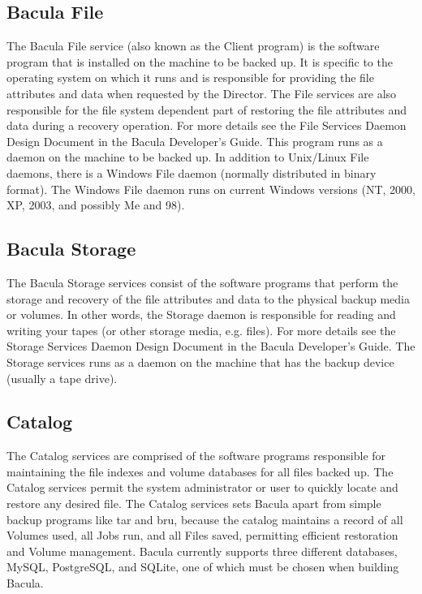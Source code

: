 \subsection*{Bacula File}
   \label{FDDef}
   The Bacula File service (also known as the Client program) is the software
   program that is installed on the machine to be backed up.
   It is specific to the
   operating system on which it runs and is responsible for providing the
   file attributes and data when requested by the Director.  The File
   services are also responsible for the file system dependent part of
   restoring the file attributes and data during a recovery operation.  For
   more details see the File Services Daemon Design Document in the Bacula
   Developer's Guide.  This program runs as a daemon on the machine to be
   backed up.
   In addition to Unix/Linux File daemons, there is a Windows File daemon
   (normally distributed in binary format).  The Windows File daemon runs
   on current Windows versions (NT, 2000, XP, 2003, and possibly Me and
   98).

\subsection*{Bacula Storage}
   \label{SDDef}
   The Bacula Storage services consist of the software programs that
   perform the storage and recovery of the file attributes and data to the
   physical backup media or volumes.  In other words, the Storage daemon is
   responsible for reading and writing your tapes (or other storage media,
   e.g.  files).  For more details see the Storage Services Daemon Design
   Document in the Bacula Developer's Guide.  The Storage services runs as
   a daemon on the machine that has the backup device (usually a tape
   drive).

\subsection*{Catalog}
   \label{DBDefinition}
   The Catalog services are comprised of the software programs
   responsible for maintaining the file indexes and volume databases for
   all files backed up.  The Catalog services permit the system
   administrator or user to quickly locate and restore any desired file.
   The Catalog services sets Bacula apart from simple backup programs like
   tar and bru, because the catalog maintains a record of all Volumes used,
   all Jobs run, and all Files saved, permitting efficient restoration and
   Volume management.  Bacula currently supports three different databases,
   MySQL, PostgreSQL, and SQLite, one of which must be chosen when building
   Bacula.


